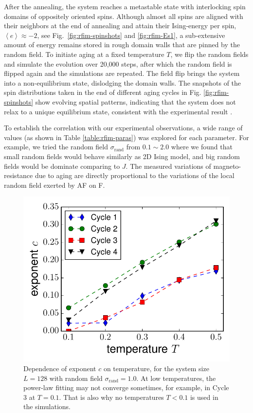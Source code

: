 After the annealing, the system reaches a metastable state with interlocking spin domains of oppositely oriented spins. Although almost all spins are aligned with their neighbors at the end of annealing and attain their Ising-energy per spin, $\left\langle e\right\rangle \approx-2$,
see Fig.~\ref{fig:rfim-spinshots} and \ref{fig:rfim-Es1}, a sub-extensive amount of energy remains stored in rough domain walls that are pinned by the random field. To initiate aging at a fixed temperature $T$, we flip the random fields and simulate the evolution over 20,000 steps, after which the random field is flipped again and the simulations are repeated. The field flip brings the system into a non-equilibrium state, dislodging the domain walls. The snapshots of the spin distributions taken in the end of different aging cycles in Fig. \ref{fig:rfim-spinshots} show evolving spatial patterns, indicating that the system does  not relax to a unique equilibrium state, consistent with the experimental result \cite{ma2016prb}.

To establish the correlation with our experimental observations, a wide range of values (as shown in Table \ref{table:rfim-paras}) was explored for each parameter. For example, we tried the random field $\sigma_{\text{rand}}$ from $0.1 \sim 2.0$ where we found that small random fields would behave similarly as 2D Ising model, and big random fields would be dominate comparing to $J$. The measured variations of magneto-resistance due to aging are directly proportional to the variations of the local random field exerted by AF on F.  

\begin{figure}
\centering \includegraphics[width=0.5\columnwidth]{Chapter-4/exponent_scale_4cycle_T03}
\protect\caption{Dependence of exponent $c$ on temperature, for the system size $L=128$ with random field $\sigma_{\text{rand}}=1.0$. At low temperatures, the power-law fitting may not converge sometimes, for example, in Cycle 3 at $T=0.1$. That is also why no temperatures $T<0.1$ is used in the simulations. }
\label{fig:rfim-expT} 
\end{figure}

